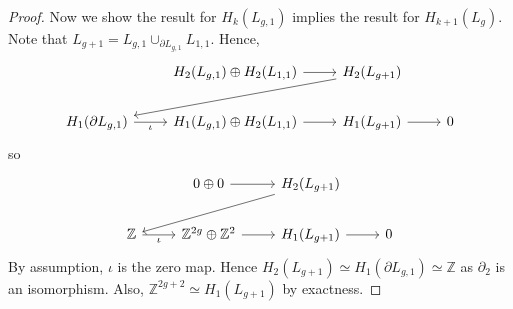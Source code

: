 \begin{proof}
	Now we show the result for \( H_k(L_{g,1}) \) implies the result for \( H_{k+1}(L_g) \).
	Note that \( L_{g+1} = L_{g,1} \cup_{\partial L_{g,1}} L_{1,1} \).
	Hence,
	\[\begin{tikzcd}
		& {H_2(L_{g,1}) \oplus H_2(L_{1,1})} & {H_2(L_{g+1})} \\
		{H_1(\partial L_{g,1})} & {H_1(L_{g,1}) \oplus H_2(L_{1,1})} & {H_1(L_{g+1})} & 0
		\arrow[from=1-2, to=1-3]
		\arrow[from=1-3, to=2-1]
		\arrow["{\iota}"', from=2-1, to=2-2]
		\arrow[from=2-2, to=2-3]
		\arrow[from=2-3, to=2-4]
	\end{tikzcd}\]
	so
	\[\begin{tikzcd}
		& {0 \oplus 0} & {H_2(L_{g+1})} \\
		{\mathbb Z} & {\mathbb Z^{2g} \oplus \mathbb Z^2} & {H_1(L_{g+1})} & 0
		\arrow[from=1-2, to=1-3]
		\arrow[from=1-3, to=2-1]
		\arrow["{\iota}"', from=2-1, to=2-2]
		\arrow[from=2-2, to=2-3]
		\arrow[from=2-3, to=2-4]
	\end{tikzcd}\]
	By assumption, \( \iota \) is the zero map.
	Hence \( H_2(L_{g+1}) \simeq H_1(\partial L_{g,1}) \simeq \mathbb Z \) as \( \partial_2 \) is an isomorphism.
	Also, \( \mathbb Z^{2g+2} \simeq H_1(L_{g+1}) \) by exactness.
\end{proof}


